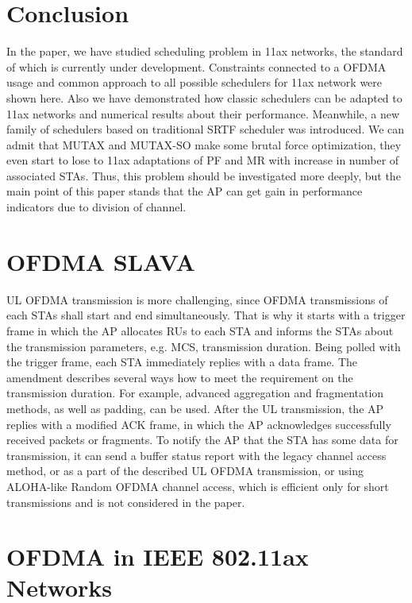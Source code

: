 \section{Conclusion}
\label{sec:conclusion}

In the paper, we have studied scheduling problem in 11ax networks, the standard of which is currently under development. Constraints connected to a OFDMA usage and common approach to all possible schedulers for 11ax network were shown here. 
Also we have demonstrated how classic schedulers can be adapted to 11ax networks and numerical results about their performance. 
Meanwhile, a new family of schedulers based on traditional SRTF scheduler was introduced. 
We can admit that MUTAX and MUTAX-SO make some brutal force optimization, they even start to lose to 11ax adaptations of PF and MR with increase in number of associated STAs. 
Thus, this problem should be investigated more deeply, but the main point of this paper stands that the AP can get gain in performance indicators due to division of channel.

\iffalse
\clearpage

\section{OFDMA SLAVA}

UL OFDMA transmission is more challenging, since
OFDMA transmissions of each STAs shall start and end
simultaneously. That is why it starts with a trigger frame in
which the AP allocates RUs to each STA and informs the
STAs about the transmission parameters, e.g. MCS, transmission
duration. Being polled with the trigger frame, each
STA immediately replies with a data frame. The amendment
describes several ways how to meet the requirement on the
transmission duration. For example, advanced aggregation and
fragmentation methods, as well as padding, can be used. After
the UL transmission, the AP replies with a modified ACK
frame, in which the AP acknowledges successfully received
packets or fragments. To notify the AP that the STA has
some data for transmission, it can send a buffer status report
with the legacy channel access method, or as a part of the
described UL OFDMA transmission, or using ALOHA-like
Random OFDMA channel access, which is efficient only for
short transmissions and is not considered in the paper.

\section{OFDMA in IEEE 802.11ax Networks}
